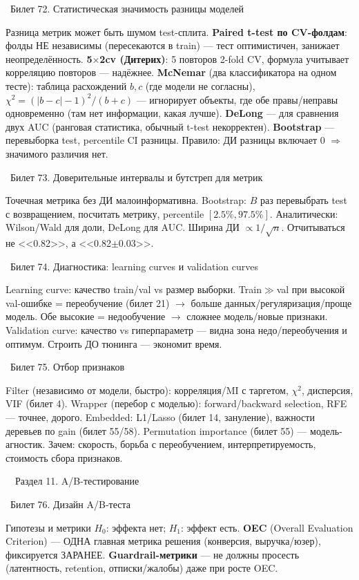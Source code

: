 \documentclass[12pt, a4paper]{article}
\newcommand{\razdel}[2]{%
  \clearpage%
  \noindent\colorbox{razdelcol}{\parbox{\dimexpr\linewidth-2\fboxsep\relax}{%
    \color{white}\LARGE\bfseries\strut\ \ Раздел #1. #2%
  }}%
  \vspace{10pt}%
}
\newcommand{\bilet}[2]{%
  \vspace{10pt}%
  \noindent\colorbox{qcolor}{\parbox{\dimexpr\linewidth-2\fboxsep\relax}{%
    \color{white}\large\bfseries\strut\ Билет #1. #2%
  }}%
  \nopagebreak\vspace{5pt}\par\nopagebreak%
}
\begin{document}
\bilet{72}{Статистическая значимость разницы моделей}
Разница метрик может быть шумом test-сплита. \textbf{Paired t-test по CV-фолдам}: фолды НЕ независимы (пересекаются в train) --- тест оптимистичен, занижает неопределённость. \textbf{5$\times$2cv (Дитерих)}: 5 повторов 2-fold CV, формула учитывает корреляцию повторов --- надёжнее. \textbf{McNemar} (два классификатора на одном тесте): таблица расхождений $b,c$ (где модели не согласны), $\chi^2=(|b-c|-1)^2/(b+c)$ --- игнорирует объекты, где обе правы/неправы одновременно (там нет информации, какая лучше). \textbf{DeLong} --- для сравнения двух AUC (ранговая статистика, обычный t-test некорректен). \textbf{Bootstrap} --- перевыборка test, percentile CI разницы. Правило: ДИ разницы включает 0 $\Rightarrow$ значимого различия нет.

\bilet{73}{Доверительные интервалы и бутстреп для метрик}
Точечная метрика без ДИ малоинформативна. Bootstrap: $B$ раз перевыбрать test с возвращением, посчитать метрику, percentile $[2.5\%,97.5\%]$. Аналитически: Wilson/Wald для доли, DeLong для AUC. Ширина ДИ $\propto 1/\sqrt n$. Отчитываться не <<0.82>>, а <<0.82$\pm$0.03>>.

\bilet{74}{Диагностика: learning curves и validation curves}
Learning curve: качество train/val vs размер выборки. Train$\gg$val при высокой val-ошибке = переобучение (билет 21) $\to$ больше данных/регуляризация/проще модель. Обе высокие = недообучение $\to$ сложнее модель/новые признаки. Validation curve: качество vs гиперпараметр --- видна зона недо/переобучения и оптимум. Строить ДО тюнинга --- экономит время.

\bilet{75}{Отбор признаков}
Filter (независимо от модели, быстро): корреляция/MI с таргетом, $\chi^2$, дисперсия, VIF (билет 4). Wrapper (перебор с моделью): forward/backward selection, RFE --- точнее, дорого. Embedded: L1/Lasso (билет 14, зануление), важности деревьев по gain (билет 55/58). Permutation importance (билет 55) --- модель-агностик. Зачем: скорость, борьба с переобучением, интерпретируемость, стоимость сбора признаков.

\vspace{1cm}
\razdel{11}{A/B-тестирование}

\bilet{76}{Дизайн A/B-теста}

\begin{defbox}{Гипотезы и метрики}
$H_0$: эффекта нет; $H_1$: эффект есть. \textbf{OEC} (Overall Evaluation Criterion) --- ОДНА главная метрика решения (конверсия, выручка/юзер), фиксируется ЗАРАНЕЕ. \textbf{Guardrail-метрики} --- не должны просесть (латентность, retention, отписки/жалобы) даже при росте OEC.
\end{defbox}
\end{document}
